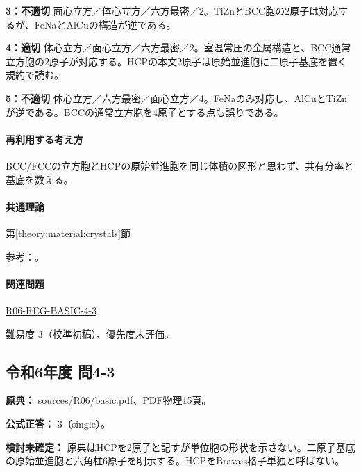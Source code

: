 \noindent\textbf{3：不適切} 面心立方／体心立方／六方最密／2。TiZnとBCC胞の2原子は対応するが、FeNaとAlCuの構造が逆である。\par

\noindent\textbf{4：適切} 体心立方／面心立方／六方最密／2。室温常圧の金属構造と、BCC通常立方胞の2原子が対応する。HCPの本文2原子は原始並進胞に二原子基底を置く規約で読む。\par

\noindent\textbf{5：不適切} 体心立方／六方最密／面心立方／4。FeNaのみ対応し、AlCuとTiZnが逆である。BCCの通常立方胞を4原子とする点も誤りである。\par

\paragraph{再利用する考え方} BCC/FCCの立方胞とHCPの原始並進胞を同じ体積の図形と思わず、共有分率と基底を数える。

\paragraph{共通理論} \hyperref[theory:material:crystals]{第\ref*{theory:material:crystals}節}

\par 参考：\cite{cambridge_unitcell,princeton_hcp,princeton_iron,princeton_aluminum,princeton_copper,princeton_sodium,princeton_titanium,princeton_zinc}。

\paragraph{関連問題} \hyperref[q:r06-reg-basic-4-3]{R06-REG-BASIC-4-3}

\par 難易度 3（校準初稿）、優先度未評価。

\subsection{令和6年度 問4-3}
\label{q:r06-reg-basic-4-3}

\noindent\textbf{原典：} sources/R06/basic.pdf、PDF物理15頁。

\textbf{公式正答：} 3（single）。

\par\textbf{検討未確定：} 原典はHCPを2原子と記すが単位胞の形状を示さない。二原子基底の原始並進胞と六角柱6原子を明示する。HCPをBravais格子単独と呼ばない。

